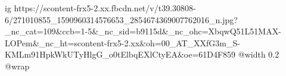  
 
 
 
 

\ifcmt
  ig https://scontent-frx5-2.xx.fbcdn.net/v/t39.30808-6/271010855_1590960314576653_2854674369007762016_n.jpg?_nc_cat=109&ccb=1-5&_nc_sid=b9115d&_nc_ohc=XbqwQ51L51MAX-LOPem&_nc_ht=scontent-frx5-2.xx&oh=00_AT_XXfG3m_S-KMLm91HpkWkUTyHlgG_o0tElbqEXlCtyEA&oe=61D4F859
  @width 0.2
  @wrap \parpic[l]
\fi

